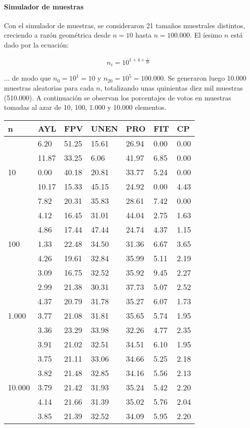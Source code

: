 \documentclass[12pt, a4paper]{article}
\begin{document}
\paragraph{Simulador de muestras}

Con el simulador de muestras, se consideraron 21 tama\~nos muestrales distintos, creciendo a raz\'on geom\'etrica desde $n=10$ hasta $n=100.000$. El \'iesimo $n$ est\'a dado por la ecuaci\'on:

$$ n_{i} = 10^{1 + 4 \times \frac{i}{20}} $$

... de modo que $n_{0}=10^{1}=10$ y $n_{20}=10^{5}=100.000$. Se generaron luego 10.000 muestras aleatorias para cada $n$, totalizando unas quinientas diez mil muestras (510.000). A continuaci\'on se observan los porcentajes de votos en muestras tomadas al azar de 10, 100, 1.000 y 10.000 elementos.

\begin{center}
	\begin{tabular}{l | llllll}
		n & AYL & FPV & UNEN & PRO & FIT & CP \\ \hline
\multirow{5}{*}{10} & 6.20 & 51.25 & 15.61 & 26.94 & 0.00 & 0.00 \\
& 11.87 & 33.25 & 6.06 & 41.97 & 6.85 & 0.00 \\
& 0.00 & 40.18 & 20.81 & 33.77 & 5.24 & 0.00 \\
& 10.17 & 15.33 & 45.15 & 24.92 & 0.00 & 4.43 \\
& 7.82 & 20.31 & 35.83 & 28.61 & 7.42 & 0.00 \\ \hline
\multirow{5}{*}{100} & 4.12 & 16.45 & 31.01 & 44.04 & 2.75 & 1.63 \\
& 4.86 & 17.44 & 47.44 & 24.74 & 4.37 & 1.15 \\
& 1.33 & 22.48 & 34.50 & 31.36 & 6.67 & 3.65 \\
& 4.26 & 19.61 & 32.84 & 35.99 & 5.11 & 2.19 \\
& 3.09 & 16.75 & 32.52 & 35.92 & 9.45 & 2.27 \\ \hline
\multirow{5}{*}{1.000} & 2.99 & 21.38 & 30.31 & 37.73 & 5.07 & 2.52 \\
& 4.37 & 20.79 & 31.78 & 35.27 & 6.07 & 1.73 \\
& 3.77 & 21.08 & 31.81 & 35.65 & 5.74 & 1.95 \\
& 3.36 & 23.29 & 33.98 & 32.26 & 4.77 & 2.35 \\ 
& 3.91 & 21.02 & 32.51 & 34.51 & 6.10 & 1.95 \\ \hline
\multirow{5}{*}{10.000} & 3.75 & 21.11 & 33.06 & 34.66 & 5.25 & 2.18 \\
& 3.82 & 21.48 & 32.85 & 34.16 & 5.56 & 2.13 \\
& 3.79 & 21.42 & 31.93 & 35.24 & 5.42 & 2.20 \\
& 4.14 & 21.66 & 31.39 & 35.02 & 5.76 & 2.04 \\
& 3.85 & 21.39 & 32.52 & 34.09 & 5.95 & 2.20 \\
	\end{tabular}
\end{center}
\end{document}

